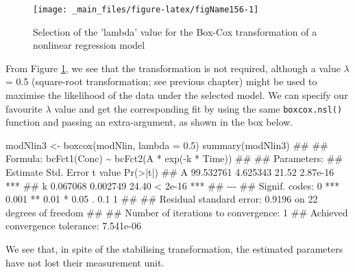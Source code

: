 \documentclass[a4paper,12pt,oneside]{book}
\newenvironment{Shaded}{\begin{snugshade}}{\end{snugshade}}
\newcommand{\FloatTok}[1]{#1}
\newcommand{\DocumentationTok}[1]{#1}
\newcommand{\OtherTok}[1]{#1}
\newcommand{\FunctionTok}[1]{#1}
\newcommand{\AttributeTok}[1]{#1}
\newcommand{\NormalTok}[1]{#1}
\begin{document}
\begin{figure}

{\centering \texttt{[image: \_main\_files/figure-latex/figName156-1]} 

}

\caption{Selection of the 'lambda' value for the Box-Cox transformation of a nonlinear regression model}\label{fig:figName156}
\end{figure}

From Figure \ref{fig:figName156}, we see that the transformation is not required, although a value \(\lambda\) = 0.5 (square-root transformation; see previous chapter) might be used to maximise the likelihood of the data under the selected model. We can specify our favourite \(\lambda\) value and get the corresponding fit by using the same \texttt{boxcox.nsl()} function and passing an extra-argument, as shown in the box below.

\vspace{12pt}

\begin{Shaded}
\begin{Highlighting}[]
\NormalTok{modNlin3 }\OtherTok{\textless{}{-}} \FunctionTok{boxcox}\NormalTok{(modNlin, }\AttributeTok{lambda =} \FloatTok{0.5}\NormalTok{)}
\FunctionTok{summary}\NormalTok{(modNlin3)}
\DocumentationTok{\#\# }
\DocumentationTok{\#\# Formula: bcFct1(Conc) \textasciitilde{} bcFct2(A * exp({-}k * Time))}
\DocumentationTok{\#\# }
\DocumentationTok{\#\# Parameters:}
\DocumentationTok{\#\#    Estimate Std. Error t value Pr(\textgreater{}|t|)    }
\DocumentationTok{\#\# A 99.532761   4.625343   21.52 2.87e{-}16 ***}
\DocumentationTok{\#\# k  0.067068   0.002749   24.40  \textless{} 2e{-}16 ***}
\DocumentationTok{\#\# {-}{-}{-}}
\DocumentationTok{\#\# Signif. codes:  0 \textquotesingle{}***\textquotesingle{} 0.001 \textquotesingle{}**\textquotesingle{} 0.01 \textquotesingle{}*\textquotesingle{} 0.05 \textquotesingle{}.\textquotesingle{} 0.1 \textquotesingle{} \textquotesingle{} 1}
\DocumentationTok{\#\# }
\DocumentationTok{\#\# Residual standard error: 0.9196 on 22 degrees of freedom}
\DocumentationTok{\#\# }
\DocumentationTok{\#\# Number of iterations to convergence: 1 }
\DocumentationTok{\#\# Achieved convergence tolerance: 7.541e{-}06}
\end{Highlighting}
\end{Shaded}

We see that, in spite of the stabilising transformation, the estimated parameters have not lost their measurement unit.
\end{document}
